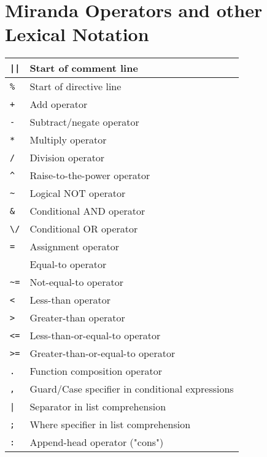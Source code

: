 \documentclass[]{article}
\begin{document}
\section*{Miranda Operators and other Lexical Notation}

\centering
\begin{tabular}{ | l | l | }
	\hline
	\texttt{||} 					& Start of comment line								\\ \hline	
	\texttt{\%}						& Start of directive line							\\ \hline
	\hline
	\texttt{+}						& Add operator 										\\ \hline
	\texttt{-}						& Subtract/negate operator							\\ \hline
	\texttt{*}						& Multiply operator									\\ \hline
	\texttt{/}						& Division operator									\\ \hline
	\texttt{\^{}}					& Raise-to-the-power operator						\\ \hline
	\hline
	\texttt{\textasciitilde}		& Logical NOT operator								\\ \hline
	\texttt{\&}						& Conditional AND operator							\\ \hline
	\texttt{\textbackslash/}		& Conditional OR operator							\\ \hline
	\hline
	\texttt{=}						& Assignment operator								\\ 
									& Equal-to operator									\\ \hline
	\texttt{\textasciitilde=}		& Not-equal-to operator								\\ \hline
	\texttt{<}						& Less-than operator								\\ \hline
	\texttt{>}						& Greater-than operator								\\ \hline
	\texttt{<=}						& Less-than-or-equal-to operator					\\ \hline
	\texttt{>=}						& Greater-than-or-equal-to operator					\\ \hline
	\hline
	\texttt{.}						& Function composition operator						\\ \hline
	\texttt{,}						& Guard/Case specifier in conditional expressions	\\ \hline
	\texttt{|}						& Separator in list comprehension					\\ \hline
	\texttt{;}						& Where specifier in list comprehension				\\ \hline
	\hline
	\texttt{:}						& Append-head operator ("cons")						\\ \hline

\end{tabular}
\end{document}

